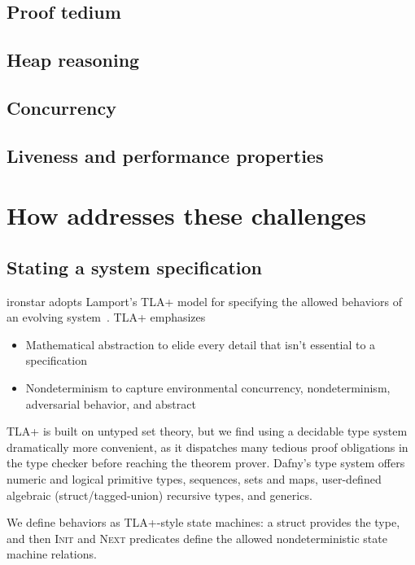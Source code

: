 \subsection{Proof tedium}

\subsection{Heap reasoning}

\subsection{Concurrency}

\subsection{Liveness and performance properties}

\section{How {\ironstar} addresses these challenges}

\subsection{Stating a system specification}\label{sec:specification}

{ironstar} adopts Lamport's TLA+ model for specifying the
allowed behaviors of an evolving system~\cite{specifying-systems}.
TLA+ emphasizes
\begin{itemize}
\item Mathematical abstraction to elide every detail that isn't
  essential to a specification
\item Nondeterminism to capture environmental concurrency,
  nondeterminism, adversarial behavior, and abstract 
\end{itemize}

TLA+ is built on untyped set theory, but we find using a
decidable type system dramatically more convenient,
as it dispatches many tedious proof obligations in the type checker before
reaching the theorem prover.
Dafny's type system offers numeric and logical primitive types,
sequences, sets and maps, user-defined
algebraic (struct/tagged-union) recursive types, and generics.

We define behaviors as TLA+-style state machines:
a struct provides the  type, and
then \textsc{Init} and \textsc{Next} predicates define
the allowed nondeterministic state machine relations.

